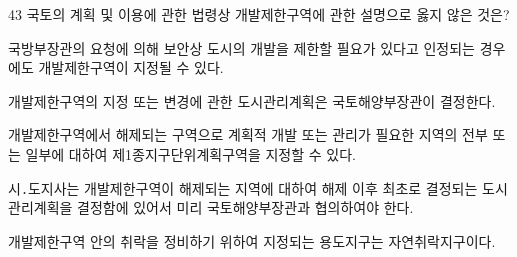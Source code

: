 \begin{question}{43}
국토의 계획 및 이용에 관한 법령상 개발제한구역에 관한 설명으로 옳지 않은 것은?
\begin{choices}
  \item 국방부장관의 요청에 의해 보안상 도시의 개발을 제한할 필요가 있다고 인정되는 경우에도 개발제한구역이 지정될 수 있다.
  \item 개발제한구역의 지정 또는 변경에 관한 도시관리계획은 국토해양부장관이 결정한다.
  \item 개발제한구역에서 해제되는 구역으로 계획적 개발 또는 관리가 필요한 지역의 전부 또는 일부에 대하여 제1종지구단위계획구역을 지정할 수 있다.
  \item 시․도지사는 개발제한구역이 해제되는 지역에 대하여 해제 이후 최초로 결정되는 도시관리계획을 결정함에 있어서 미리 국토해양부장관과 협의하여야 한다.
  \item 개발제한구역 안의 취락을 정비하기 위하여 지정되는 용도지구는 자연취락지구이다.
\end{choices}
\end{question}
